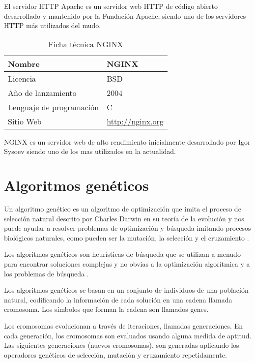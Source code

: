 El servidor HTTP Apache es un servidor web HTTP de código abierto desarrollado y mantenido por la Fundación Apache, siendo uno de los servidores HTTP más utilizados del mudo.

\begin{table}[H]
\begin{tabular}{|l|l|}
\hline
Nombre                   & NGINX                       \\ \hline
Licencia                 & BSD                        \\ \hline
Año de lanzamiento       & 2004                        \\ \hline
Lenguaje de programación & C                            \\ \hline
Sitio Web                & \url{http://nginx.org} \\ \hline
\end{tabular}
\caption{Ficha técnica NGINX}
\end{table}

NGINX es un servidor web de alto rendimiento inicialmente desarrollado por Igor Sysoev siendo uno de los mas utilizados en la actualidad.

\section {Algoritmos genéticos}

Un algoritmo genético es un algoritmo de optimización que imita el proceso de selección natural descrito por Charles Darwin en su teoría de la evolución y nos puede ayudar a resolver problemas de optimización y búsqueda imitando procesos biológicos naturales, como pueden ser la mutación, la selección y el cruzamiento \cite{batista_algoritmos_2009}.

\bigskip
Los algoritmos genéticos son heurísticas de búsqueda que se utilizan a menudo para encontrar soluciones complejas y no obvias a la optimización algorítmica y a los problemas de búsqueda \cite{orcero_inteligencia_2002}.

\bigskip
Los algoritmos genéticos se basan en un conjunto de individuos de una población natural, codificando la información de cada solución en una cadena llamada cromosoma. Los símbolos que forman la cadena son llamados genes.

\bigskip
Los cromosomas evolucionan a través de iteraciones, llamadas generaciones. En cada generación, los cromosomas son evaluados usando alguna medida de aptitud. Las siguientes generaciones (nuevos cromosomas), son generadas aplicando los operadores genéticos de selección, mutación y cruzamiento repetidamente.


